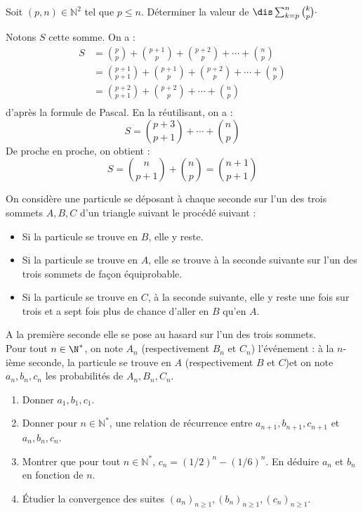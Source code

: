\documentclass[a4paper,10pt]{report}
\begin{document}
\begin{Exercice}{} Soit $(p, n) \in \mathbb{N}^2$ tel que $p \leq n$. Déterminer la valeur de $\dis\sum_{k=p}^n{k\choose p} \cdot$

\end{Exercice}

\corr Notons $S$ cette somme. On a :
\begin{align*}
S & = \binom{p}{p} + \binom{p+1}{p} + \binom{p+2}{p} + \cdots + \binom{n}{p} \\
& = \binom{p+1}{p+1} + \binom{p+1}{p} + \binom{p+2}{p} + \cdots + \binom{n}{p} \\
& =  \binom{p+2}{p+1} + \binom{p+2}{p} + \cdots + \binom{n}{p} \\
\end{align*}
d'après la formule de Pascal. En la réutilisant, on a :
$$ S = \binom{p+3}{p+1} +  \cdots + \binom{n}{p} $$
De proche en proche, on obtient :
$$ S = \binom{n}{p+1}  + \binom{n}{p} = \binom{n+1}{p+1} $$

\begin{Exercice}{} On considère une particule se déposant à chaque seconde sur l'un des trois sommets $A,B,C$ d'un triangle suivant le procédé suivant :

\vspace{0.3cm}

\begin{itemize}
 \item Si la particule se trouve en $B$, elle y reste.
 \item Si la particule se trouve en $A$, elle se trouve à la seconde suivante sur l'un des trois sommets de façon équiprobable.
 \item Si la particule se trouve en $C$, à la seconde suivante, elle y reste une fois sur trois et a sept fois plus de chance d'aller en $B$ qu'en $A$.
\end{itemize}

\vspace{0.3cm}

\noindent A la première seconde elle se pose au hasard sur l'un des trois sommets.\\
Pour tout $n\in \N^*$, on note $A_n$ (respectivement $B_n$ et $C_n$) l'événement : \og à la $n$-ième seconde, la particule se trouve en $A$ (respectivement $B$ et $C$)\fg et on note $a_n, b_n, c_n$ les probabilités de $A_n, B_n, C_n$.

\vspace{0.3cm}

\begin{enumerate}
 \item Donner $a_1, b_1, c_1$.
 \item Donner pour $n \in \mathbb{N}^*$, une relation de récurrence entre $a_{n+1}, b_{n+1}, c_{n+1}$ et $a_n, b_n, c_n$.
 \item Montrer que pour tout $n \in \mathbb{N}^*$, $c_n = (1/2)^n-(1/6)^n$. En déduire $a_n$ et $b_n$ en fonction de $n$.
 \item Étudier la convergence des suites $(a_n)_{n \geq 1}, (b_n)_{n \geq 1}, (c_n)_{n \geq 1}$.
\end{enumerate}
\end{Exercice}
\end{document}
